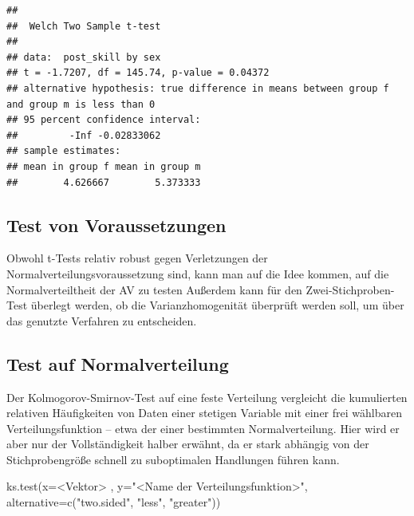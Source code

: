 \documentclass[
]{book}
\newenvironment{Shaded}{\begin{snugshade}}{\end{snugshade}}
\newcommand{\AttributeTok}[1]{\textcolor[rgb]{0.77,0.63,0.00}{#1}}
\newcommand{\FunctionTok}[1]{\textcolor[rgb]{0.00,0.00,0.00}{#1}}
\newcommand{\NormalTok}[1]{#1}
\newcommand{\SpecialCharTok}[1]{\textcolor[rgb]{0.00,0.00,0.00}{#1}}
\newcommand{\StringTok}[1]{\textcolor[rgb]{0.31,0.60,0.02}{#1}}
\begin{document}
\begin{verbatim}
## 
##  Welch Two Sample t-test
## 
## data:  post_skill by sex
## t = -1.7207, df = 145.74, p-value = 0.04372
## alternative hypothesis: true difference in means between group f and group m is less than 0
## 95 percent confidence interval:
##         -Inf -0.02833062
## sample estimates:
## mean in group f mean in group m 
##        4.626667        5.373333
\end{verbatim}

\hypertarget{test-von-voraussetzungen}{%
\subsection{Test von Voraussetzungen}\label{test-von-voraussetzungen}}

Obwohl t-Tests relativ robust gegen Verletzungen der Normalverteilungsvoraussetzung sind, kann man auf die Idee kommen, auf die Normalverteiltheit der AV zu testen
Außerdem kann für den Zwei-Stichproben-Test überlegt werden, ob die Varianzhomogenität überprüft werden soll, um über das genutzte Verfahren zu entscheiden.

\hypertarget{test-auf-normalverteilung}{%
\subsection{Test auf Normalverteilung}\label{test-auf-normalverteilung}}

Der Kolmogorov-Smirnov-Test auf eine feste Verteilung vergleicht die kumulierten relativen
Häufigkeiten von Daten einer stetigen Variable mit einer frei wählbaren Verteilungsfunktion --
etwa der einer bestimmten Normalverteilung. Hier wird er aber nur der Vollständigkeit halber erwähnt, da er stark abhängig von der Stichprobengröße schnell zu suboptimalen Handlungen führen kann.

\begin{Shaded}
\begin{Highlighting}[]
\FunctionTok{ks.test}\NormalTok{(}\AttributeTok{x=}\SpecialCharTok{\textless{}}\NormalTok{Vektor}\SpecialCharTok{\textgreater{}}\NormalTok{ , }\AttributeTok{y=}\StringTok{"\textless{}Name der Verteilungsfunktion\textgreater{}"}\NormalTok{, }
        \AttributeTok{alternative=}\FunctionTok{c}\NormalTok{(}\StringTok{"two.sided"}\NormalTok{, }\StringTok{"less"}\NormalTok{, }\StringTok{"greater"}\NormalTok{))}
\end{Highlighting}
\end{Shaded}
\end{document}
